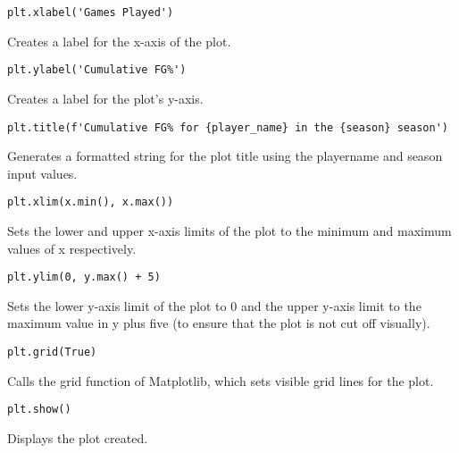 \documentclass{article}
\begin{document}
\begin{lstlisting}
plt.xlabel('Games Played')
\end{lstlisting}
Creates a label for the x-axis of the plot.
\begin{lstlisting}
plt.ylabel('Cumulative FG%')
\end{lstlisting}
Creates a label for the plot's y-axis.
\begin{lstlisting}
plt.title(f'Cumulative FG% for {player_name} in the {season} season')
\end{lstlisting}
Generates a formatted string for the plot title using the player\textunderscore name and season input values.
\begin{lstlisting}
plt.xlim(x.min(), x.max())
\end{lstlisting}
Sets the lower and upper x-axis limits of the plot to the minimum and maximum values of x respectively.
\begin{lstlisting}
plt.ylim(0, y.max() + 5)
\end{lstlisting}
Sets the lower y-axis limit of the plot to 0 and the upper y-axis limit to the maximum value in y plus five (to ensure that the plot is not cut off visually).
\begin{lstlisting}
plt.grid(True)
\end{lstlisting}
Calls the grid function of Matplotlib, which sets visible grid lines for the plot.
\begin{lstlisting}
plt.show()
\end{lstlisting}
Displays the plot created.
\end{document}
